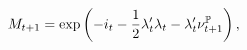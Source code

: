 \begin{equation} \label{eq:nSDF}
	M_{t+1} = \exp\left( -i_{t} -\frac{1}{2} \lambda_{t}' \lambda_{t} - \lambda_{t}' \nu_{t+1}^{\mathbb{P}} \right) ,
\end{equation}